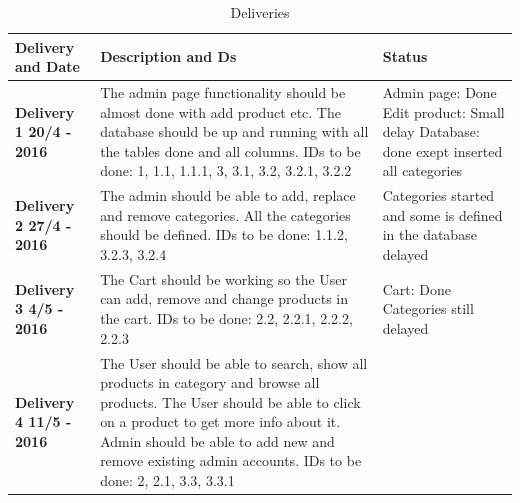 \documentclass[a4paper,12pt]{article}
\begin{document}
\begin{table}[htbp]
	\centering
	\caption{Deliveries}
	\label{my-label}
	\begin{tabular}{|L{4cm}|L{7cm}|L{4cm}|}
		\hline
		\textbf{Delivery and Date}& \textbf{Description and Ds}                                                                                                                                                                                                                                                                                   & \textbf{Status} \\ \hline
		\textbf{Delivery 1  20/4 - 2016} & The admin page functionality should be almost done with add product etc. \newline The database should be up and running with all the tables done and all columns. \newline IDs to be done: 1, 1.1, 1.1.1, 3, 3.1, 3.2, 3.2.1, 3.2.2                                                                   &     Admin page: Done \newline Edit product: Small delay \newline Database: done exept inserted all categories            \\ \hline
		\textbf{Delivery 2 27/4 - 2016} & The admin should be able to add, replace and remove categories. \newline All the categories should be defined. \newline IDs to be done: 1.1.2, 3.2.3, 3.2.4                                                                                                                                            &  Categories started and some is defined in the database  delayed           \\ \hline
		\textbf{Delivery 3 4/5 - 2016}  & The Cart should be working so the User can add, remove and change products in the cart. \newline IDs to be done: 2.2, 2.2.1, 2.2.2, 2.2.3                                                                                                                                                      &  Cart: Done \newline Categories still delayed                \\ \hline
		\textbf{Delivery 4 11/5 - 2016} & The User should be able to search, show all products in category and browse all products. \newline The User should be able to click on a product to get more info about it. \newline Admin should be able to add new and remove existing admin accounts. \newline IDs to be done: 2, 2.1, 3.3, 3.3.1          &                 \\ \hline

\end{tabular}
\end{table}
\end{document}
